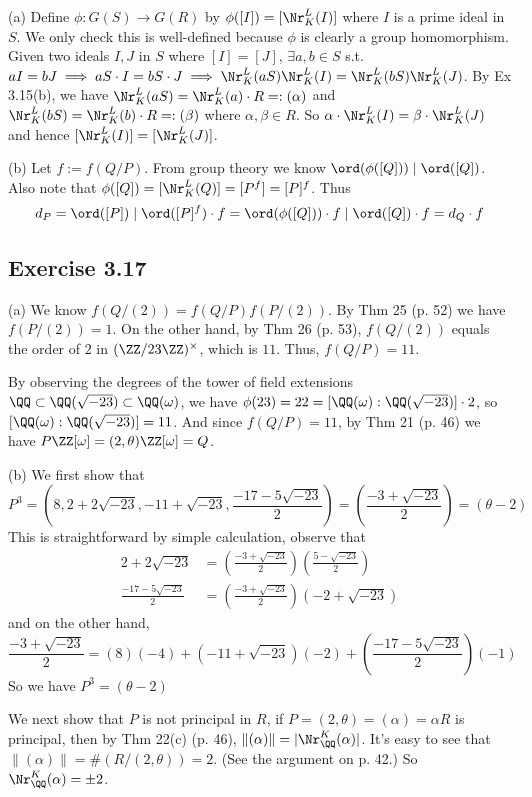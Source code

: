 \documentclass[../Chapter.tex]{subfiles}
\begin{document}
(a) Define $\phi:G(S)\to G(R)$ by $\phi([I])=[\Nr^L_K(I)]$ where $I$ is a prime ideal in $S$. We only check this is well-defined because $\phi$ is clearly a group homomorphism. Given two ideals $I,J$ in $S$ where $[I]=[J]$, $\exists a,b\in S$ s.t. $aI=bJ\implies aS\cdot I=bS\cdot J\implies \Nr^L_K(aS)\Nr^L_K(I)=\Nr^L_K(bS)\Nr^L_K(J)$. By Ex 3.15(b), we have $\Nr^L_K(aS)=\Nr^L_K(a)\cdot R=:(\alpha)$ and $\Nr^L_K(bS)=\Nr^L_K(b)\cdot R=:(\beta)$ where $\alpha,\beta\in R$. So $\alpha\cdot\Nr^L_K(I)=\beta\cdot\Nr^L_K(J)$ and hence $[\Nr^L_K(I)]=[\Nr^L_K(J)]$.

(b) Let $f:=f(Q/P)$. From group theory we know $\ord(\phi([Q]))\mid \ord([Q])$. Also note that $\phi([Q])=[\Nr^L_K(Q)]=[P^f]=[P]^f$. Thus $$d_P=\ord([P])\mid \ord([P]^f)\cdot f = \ord(\phi([Q]))\cdot f\mid \ord([Q])\cdot f=d_Q\cdot f$$

\subsection*{Exercise 3.17}

(a) We know $f(Q/(2))=f(Q/P)f(P/(2))$. By Thm 25 (p. 52) we have $f(P/(2))=1$. On the other hand, by Thm 26 (p. 53), $f(Q/(2))$ equals the order of $2$ in $(\ZZ/23\ZZ)^{\times}$, which is $11$. Thus, $f(Q/P)=11$.

By observing the degrees of the tower of field extensions $\QQ\subset \QQ(\sqrt{-23})\subset \QQ(\omega)$, we have $\phi(23)=22=[\QQ(\omega):\QQ(\sqrt{-23})]\cdot 2$, so $[\QQ(\omega):\QQ(\sqrt{-23})]=11$. And since $f(Q/P)=11$, by Thm 21 (p. 46) we have $P\ZZ[\omega]=(2,\theta)\ZZ[\omega]=Q$.

(b) We first show that $$P^3=\left(8,2+2\sqrt{-23},-11+\sqrt{-23},\frac{-17-5\sqrt{-23}}{2}\right)=\left(\frac{-3+\sqrt{-23}}{2}\right)=(\theta-2)$$ This is straightforward by simple calculation, observe that
\begin{align*}
2+2\sqrt{-23} &= \left(\frac{-3+\sqrt{-23}}{2}\right)\left(\frac{5-\sqrt{-23}}{2}\right) \\
\frac{-17-5\sqrt{-23}}{2} &= \left(\frac{-3+\sqrt{-23}}{2}\right)(-2+\sqrt{-23})
\end{align*}
and on the other hand, $$\frac{-3+\sqrt{-23}}{2}=(8)(-4)+(-11+\sqrt{-23})(-2)+\left(\frac{-17-5\sqrt{-23}}{2}\right)(-1)$$ So we have $P^3=(\theta-2)$

We next show that $P$ is not principal in $R$, if $P=(2,\theta)=(\alpha)=\alpha R$ is principal, then by Thm 22(c) (p. 46), $\|(\alpha)\|=|\Nr^K_\QQ(\alpha)|$. It's easy to see that $\|(\alpha)\|=\#(R/(2,\theta))=2$. (See the argument on p. 42.) So $\Nr^K_\QQ(\alpha)=\pm 2$.
\end{document}
